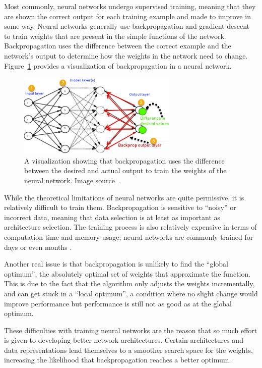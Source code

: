 \documentclass{article}
\begin{document}
Most commonly, neural networks undergo supervised training, meaning that they are shown the correct output for each training example and made to improve in some way. Neural networks generally use backpropagation and gradient descent to train weights that are present in the simple functions of the network. Backpropagation uses the difference between the correct example and the network's output to determine how the weights in the network need to change. Figure~\ref{figure:backpropagation} provides a visualization of backpropagation in a neural network.

\begin{figure}
    \centering
    \includegraphics[width=3in]{figures/backpropagation.png}
    \caption{A visualization showing that backpropagation uses the difference between the desired and actual output to train the weights of the neural network. Image source~\protect\cite{backprop}.}\label{figure:backpropagation}
\end{figure}

While the theoretical limitations of neural networks are quite permissive, it is relatively difficult to train them. Backpropagation is sensitive to ``noisy'' or incorrect data, meaning that data selection is at least as important as architecture selection. The training process is also relatively expensive in terms of computation time and memory usage; neural networks are commonly trained for days or even months \cite{attn_all_you_need}.

Another real issue is that backpropagation is unlikely to find the ``global optimum'', the absolutely optimal set of weights that approximate the function. This is due to the fact that the algorithm only adjusts the weights incrementally, and can get stuck in a ``local optimum'', a condition where no slight change would improve performance but performance is still not as good as at the global optimum.

These difficulties with training neural networks are the reason that so much effort is given to developing better network architectures. Certain architectures and data representations lend themselves to a smoother search space for the weights, increasing the likelihood that backpropagation reaches a better optimum.
\end{document}
